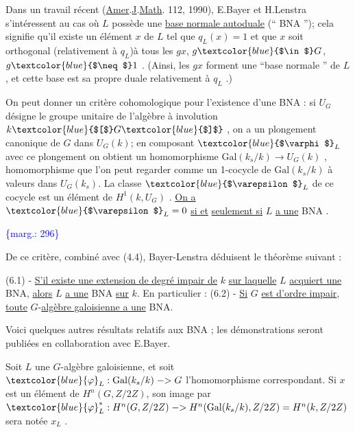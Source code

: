 \documentclass[11pt]{article}
\newcommand{\scanpage}[1]{\par\bigskip\noindent{\small\sffamily[scan #1]}\par}
\newcommand{\mspage}[1]{{\small\sffamily[p.\,#1]}}
\newcommand{\hand}[1]{\textcolor{blue}{#1}}
\newcommand{\margin}[1]{\textcolor{blue}{\{\textsf{marg.:} #1\}}}
\newcommand{\uline}[1]{\underline{#1}}
\begin{document}
Dans un travail récent (\uline{Amer}.\uline{J}.\uline{Math}. 112, 1990), E.Bayer et H.Lenstra
s'intéressent au cas où $L$ possède une \uline{base normale autoduale} (`` BNA '');
cela signifie qu'il existe un élément $x$ de $L$ tel que $q_L(x) = 1$ et
que $x$ soit orthogonal (relativement à $q_L$)à tous les $gx$, $g \hand{$\in$} G$, $g \hand{$\neq$} 1$ .
(Ainsi, les $gx$ forment une ``base normale '' de $L$, et cette base est sa
propre duale relativement à $q_L$ .)

On peut donner un critère cohomologique pour l'existence d'une BNA : si
$U_G$ désigne le groupe unitaire de l'algèbre à involution $k\hand{$[$}G\hand{$]$}$ , on a un
plongement canonique de $G$ dans $U_G(k)$; en composant $\hand{$\varphi$}_L$ avec ce plongement
on obtient un homomorphisme $\mathrm{Gal}(k_s/k) \to U_G(k)$ , homomorphisme que l'on peut
regarder comme un 1-cocycle de $\mathrm{Gal}(k_s/k)$ à valeurs dans $U_G(k_s)$. La classe
$\hand{$\varepsilon$}_L$ de ce cocycle est un élément de $H^1(k, U_G)$ . \uline{On a} $\hand{$\varepsilon$}_L = 0$ \uline{si et}
\uline{seulement si} $L$ \uline{a une} BNA .

\margin{296}

\clearpage
\scanpage{119/297}
\mspage{- 10 -}

De ce critère, combiné avec (4.4), Bayer-Lenstra déduisent le théorème
suivant :

(6.1) - \uline{S'il existe une extension de degré impair de} $k$ \uline{sur laquelle} $L$
\uline{acquiert une} BNA, \uline{alors} $L$ \uline{a une} BNA \uline{sur} $k$.
En particulier :
(6.2) - \uline{Si} $G$ \uline{est d'ordre impair}, \uline{toute} $G$-\uline{algèbre galoisienne a une} BNA.

Voici quelques autres résultats relatifs aux BNA ; les démonstrations
seront publiées en collaboration avec E.Bayer.

Soit $L$ une $G$-algèbre galoisienne, et soit $\hand{\varphi}_L : \mathrm{Gal}(k_s/k) \;{-}{>}\; G$
l'homomorphisme correspondant. Si $x$ est un élément de $H^n(G, Z/2Z)$,
son image par $\hand{\varphi}_L^{*} : H^n(G, Z/2Z) \;{-}{>}\; H^n(\mathrm{Gal}(k_s/k), Z/2Z) = H^n(k, Z/2Z)$
sera notée $x_L$ .
\end{document}
